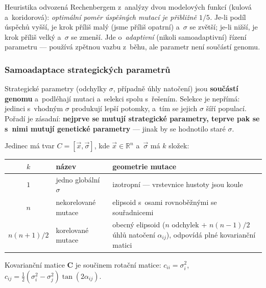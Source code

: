 \documentclass[11pt,a4paper]{article}
\theoremstyle{definition}
\begin{document}
\begin{defbox}
Heuristika odvozená Rechenbergem z~analýzy dvou modelových funkcí (kulová
a~koridorová): \emph{optimální poměr úspěšných mutací je přibližně $1/5$.}
Je-li podíl úspěchů vyšší, je krok příliš malý (jsme příliš opatrní)
a~$\sigma$ se zvětší; je-li nižší, je krok příliš velký a~$\sigma$ se zmenší.
Jde o~\emph{adaptivní} (nikoli samoadaptivní) řízení parametru --- používá
zpětnou vazbu z~běhu, ale parametr není součástí genomu.
\end{defbox}

\subsubsection{Samoadaptace strategických parametrů}

\begin{defbox}
Strategické parametry (odchylky $\sigma$, případně úhly natočení) jsou
\textbf{součástí genomu} a~podléhají mutaci a~selekci spolu s~řešením.
Selekce je nepřímá: jedinci s~vhodným $\sigma$ produkují lepší potomky,
a~tím se jejich $\sigma$ šíří populací. Pořadí je zásadní: \textbf{nejprve
se mutují strategické parametry, teprve pak se s~nimi mutují genetické
parametry} --- jinak by se hodnotilo staré $\sigma$.
\end{defbox}

Jedinec má tvar $C = [\vec x, \vec \sigma]$, kde $\vec x \in \mathbb{R}^n$
a~$\vec\sigma$ má $k$ složek:

\begin{center}
\begin{tabular}{@{}clp{8.2cm}@{}}
\toprule
$k$ & název & geometrie mutace \\
\midrule
$1$ & jedno globální $\sigma$ & izotropní --- vrstevnice hustoty jsou koule \\
$n$ & nekorelované mutace & elipsoid s~osami rovnoběžnými se souřadnicemi \\
$n(n+1)/2$ & korelované mutace & obecný elipsoid ($n$ odchylek $+$ $n(n-1)/2$
  úhlů natočení $\alpha_{ij}$), odpovídá plné kovarianční matici \\
\bottomrule
\end{tabular}
\end{center}

Kovarianční matice $\mathbf{C}$ je součinem rotační matice: $c_{ii} = \sigma_i^2$,
$c_{ij} = \tfrac12(\sigma_i^2 - \sigma_j^2)\tan(2\alpha_{ij})$.
\end{document}
